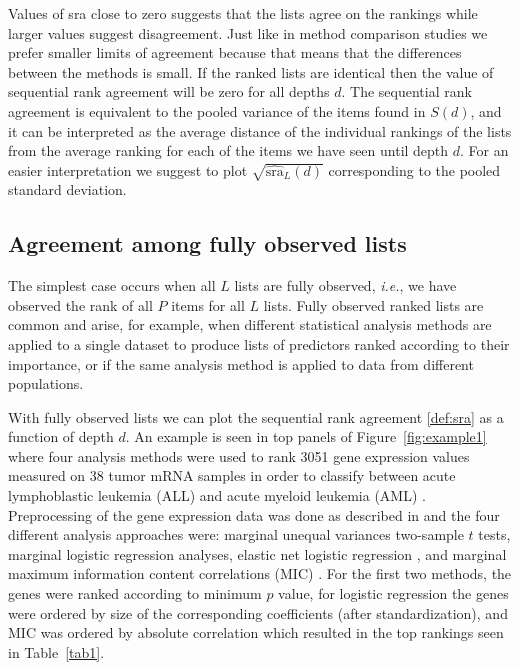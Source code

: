 \documentclass[12pt,a4paper]{article}
\makeatletter
\newcommand{\ie}{\emph{i.e.}\@\xspace}
\theoremstyle{plain}
\makeatother
\begin{document}
Values of \textrm{sra} close to zero suggests that the lists agree on
the rankings while larger values suggest disagreement.  Just like in
method comparison studies we prefer smaller limits of agreement
because that means that the differences between the methods is
small. If the ranked lists are identical then the value of sequential
rank agreement will be zero for all depths $d$.  The sequential rank
agreement is equivalent to the pooled variance of the items found in
$S(d)$, and it can be interpreted as the average distance of the
individual rankings of the lists from the average ranking for each of
the items we have seen until depth $d$.  For an easier interpretation
we suggest to plot $\sqrt{\widehat{\textrm{sra}}_L(d)}$ corresponding
to the pooled standard deviation.



\subsection{Agreement among fully observed lists}
\label{sec:amfol}

The simplest case occurs when all $L$ lists are fully observed, \ie,
we have observed the rank of all $P$ items for all $L$ lists. Fully
observed ranked lists are common and arise, for example, when
different statistical analysis methods are applied to a single dataset
to produce lists of predictors ranked according to their importance,
or if the same analysis method is applied to data from different
populations.

With fully observed lists we can plot the sequential rank agreement
\eqref{def:sra} as a function of depth $d$. An example is seen in top
panels of Figure~\ref{fig:example1} where four analysis methods were
used to rank 3051 gene expression values measured on 38 tumor mRNA
samples in order to classify between acute lymphoblastic leukemia
(ALL) and acute myeloid leukemia (AML)
\citep{Golub1999}. Preprocessing of the gene expression data was done
as described in \citet{Dudoit2002} and the four different analysis
approaches were: marginal unequal variances two-sample $t$ tests,
marginal logistic regression analyses, elastic net logistic regression
\citep{friedman2010regularization}, and marginal maximum information
content correlations (MIC) \citep{Reshef2011}. For the first two
methods, the genes were ranked according to minimum $p$ value, for
logistic regression the genes were ordered by size of the
corresponding coefficients (after standardization), and MIC was
ordered by absolute correlation which resulted in the top rankings
seen in Table~\ref{tab1}.
\end{document}
